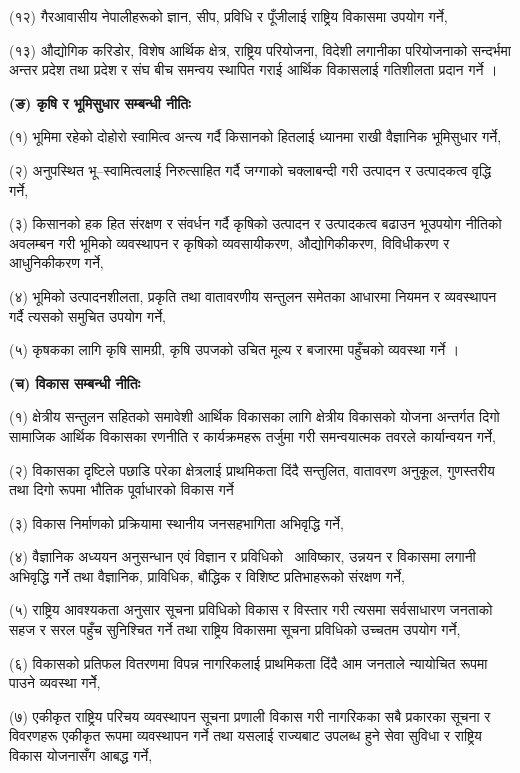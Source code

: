 (१२) गैरआवासीय नेपालीहरूको ज्ञान, सीप, प्रविधि र पूँजीलाई राष्ट्रिय विकासमा उपयोग गर्ने,

(१३) औद्योगिक करिडोर, विशेष आर्थिक क्षेत्र, राष्ट्रिय परियोजना, विदेशी लगानीका परियोजनाको सन्दर्भमा अन्तर प्रदेश तथा प्रदेश र संघ बीच समन्वय स्थापित गराई आर्थिक विकासलाई गतिशीलता प्रदान गर्ने ।

\textbf{(ङ) कृषि र भूमिसुधार सम्बन्धी नीतिः}

(१) भूमिमा रहेको दोहोरो स्वामित्व अन्त्य गर्दै किसानको हितलाई ध्यानमा राखी वैज्ञानिक भूमिसुधार गर्ने,

(२) अनुपस्थित भू–स्वामित्वलाई निरुत्साहित गर्दै जग्गाको चक्लाबन्दी गरी उत्पादन र उत्पादकत्व वृद्धि गर्ने,

(३) किसानको हक हित संरक्षण र संवर्धन गर्दै कृषिको उत्पादन र उत्पादकत्व बढाउन भूउपयोग नीतिको अवलम्बन गरी भूमिको व्यवस्थापन र कृषिको व्यवसायीकरण, औद्योगिकीकरण, विविधीकरण र आधुनिकीकरण गर्ने,

(४) भूमिको उत्पादनशीलता, प्रकृति तथा वातावरणीय सन्तुलन समेतका आधारमा नियमन र व्यवस्थापन गर्दै त्यसको समुचित उपयोग गर्ने,

(५) कृषकका लागि कृषि सामग्री, कृषि उपजको उचित मूल्य र बजारमा पहुँचको व्यवस्था गर्ने ।

\textbf{(च) विकास सम्बन्धी नीतिः}

(१) क्षेत्रीय सन्तुलन सहितको समावेशी आर्थिक विकासका लागि क्षेत्रीय विकासको योजना अन्तर्गत दिगो सामाजिक आर्थिक विकासका रणनीति र कार्यक्रमहरू तर्जुमा गरी समन्वयात्मक तवरले कार्यान्वयन गर्ने,

(२) विकासका दृष्टिले पछाडि परेका क्षेत्रलाई प्राथमिकता दिंदै सन्तुलित, वातावरण अनुकूल, गुणस्तरीय तथा दिगो रूपमा भौतिक पूर्वाधारको विकास गर्ने

(३) विकास निर्माणको प्रक्रियामा स्थानीय जनसहभागिता अभिवृद्धि गर्ने,

(४) वैज्ञानिक अध्ययन अनुसन्धान एवं विज्ञान र प्रविधिको  आविष्कार, उन्नयन र विकासमा लगानी अभिवृद्धि गर्नेे तथा वैज्ञानिक, प्राविधिक, बौद्धिक र विशिष्ट प्रतिभाहरूको संरक्षण गर्ने,

(५) राष्ट्रिय आवश्यकता अनुसार सूचना प्रविधिको विकास र विस्तार गरी त्यसमा सर्वसाधारण जनताको सहज र सरल पहुँच सुनिश्चित गर्ने तथा राष्ट्रिय विकासमा सूचना प्रविधिको उच्चतम उपयोग गर्ने,

(६) विकासको प्रतिफल वितरणमा विपन्न नागरिकलाई प्राथमिकता दिंदै आम जनताले न्यायोचित रूपमा पाउने व्यवस्था गर्नेे,

(७) एकीकृत राष्ट्रिय परिचय व्यवस्थापन सूचना प्रणाली विकास गरी नागरिकका सबै प्रकारका सूचना र विवरणहरू एकीकृत रूपमा व्यवस्थापन गर्ने तथा यसलाई राज्यबाट उपलब्ध हुने सेवा सुविधा र राष्ट्रिय विकास योजनासँग आबद्ध गर्ने,

